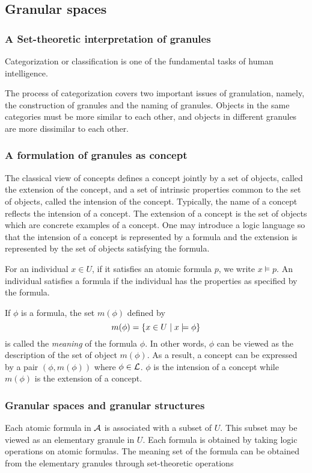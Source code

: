 \documentclass[11pt]{article}
\begin{document}
\subsection{Granular spaces}
\label{sec:org88189cd}
\subsubsection{A Set-theoretic interpretation of granules}
\label{sec:org09fce63}
Categorization or classification is one of the fundamental tasks of human
intelligence.

The process of categorization covers two important issues of granulation,
namely, the construction of granules and the naming of granules. Objects in the
same categories must be more similar to each other, and objects in different
granules are more dissimilar to each other.
\subsubsection{A formulation of granules as concept}
\label{sec:org275249d}
The classical view of concepts defines a concept jointly by a set of
objects, called the extension of the concept, and a set of intrinsic
properties common to the set of objects, called the intension of the
concept. Typically, the name of a concept reflects the intension of a
concept. The extension of a concept is the set of objects which are concrete
examples of a concept. One may introduce a logic language so that the
intension of a concept is represented by a formula and the extension is
represented by the set of objects satisfying the formula.

For an individual \(x\in U\), if it satisfies an atomic formula \(p\), we write
\(x\models p\). An individual satisfies a formula if the individual has the
properties as specified by the formula.

If \(\phi\) is a formula, the set \(m(\phi)\) defined by
\begin{equation*}
m(\phi)=\left\{ x\in U\mid x\models \phi\right\}
\end{equation*}
is called the \emph{meaning} of the formula \(\phi\). In other words, \(\phi\) can be
viewed as the description of the set of object \(m(\phi)\). As a result, a
concept can be expressed by a pair \((\phi,m(\phi))\) where \(\phi\in\mathcal{L}\).
\(\phi\) is the intension of a concept while \(m(\phi)\) is the extension of a concept.
\subsubsection{Granular spaces and granular structures}
\label{sec:orga9e2159}
Each atomic formula in \(\mathcal{A}\) is associated with a subset of \(U\). This
subset may be viewed as an elementary granule in \(U\). Each formula is
obtained by taking logic operations on atomic formulas. The meaning set of
the formula can be obtained from the elementary granules through
set-theoretic operations
\end{document}
